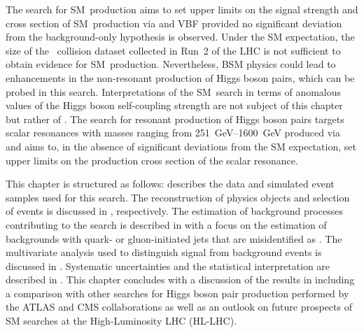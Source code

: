 The search for SM~\HH production aims to set upper limits on the signal strength
and cross section of SM~\HH production via \ggF and VBF provided no significant
deviation from the background-only hypothesis is observed. Under the SM
expectation, the size of the \pp~collision dataset collected in Run~2 of the LHC
is not sufficient to obtain evidence for SM~\HH production.  Nevertheless, BSM
physics could lead to enhancements in the non-resonant production of Higgs boson
pairs, which can be probed in this search.
Interpretations of the SM~\HH search in terms of anomalous values of the Higgs
boson self-coupling strength are not subject of this chapter but rather of
. The search for resonant production of Higgs
boson pairs targets scalar resonances with masses ranging from
\SIrange{251}{1600}{\GeV} produced via \ggF and aims to, in the absence of
significant deviations from the SM expectation, set upper limits on the
production cross section of the scalar resonance.

This chapter is structured as follows:  describes
the data and simulated event samples used for this search. The reconstruction of
physics objects and selection of events is discussed in
, respectively. The
estimation of background processes contributing to the search is described in
 with a focus on the estimation of backgrounds
with quark- or gluon-initiated jets that are misidentified as \tauhadvis. The
multivariate analysis used to distinguish signal from background events is
discussed in . Systematic uncertainties and the
statistical interpretation are described in
. This chapter concludes with a
discussion of the results in  including a comparison
with other searches for Higgs boson pair production performed by the ATLAS and
CMS collaborations as well as an outlook on future prospects of SM \HH searches
at the High-Luminosity LHC (HL-LHC).


